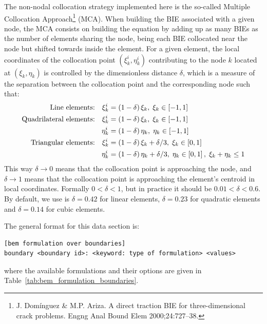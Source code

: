 \documentclass[a4paper,fleqn]{book}
\begin{document}
The non-nodal collocation strategy implemented here is the so-called Multiple Collocation Approach\footnote{J. Dom\'inguez \& M.P. Ariza. A direct traction BIE for three-dimensional
crack problems. Engng Anal Bound Elem 2000;24:727–38.} (MCA). When building the BIE associated with a given node, the MCA consists on building the equation by adding up as many BIEs as the number of elements sharing the node, being each BIE collocated near the node but shifted towards inside the element. For a given element, the local coordinates of the collocation point $(\xi^i_k,\eta^i_k)$ contributing to the node $k$ located at $(\xi_k,\eta_k)$ is controlled by the dimensionless distance $\delta$, which is a measure of the separation between the collocation point and the corresponding node such that:
\begin{align}
\textnormal{Line elements:}\quad\xi^i_k &= \left(1-\delta\right)\xi_k,\;\xi_k\in\left[-1,1\right] \\
\textnormal{Quadrilateral elements:}\quad\xi^i_k &= \left(1-\delta\right)\xi_k,\;\xi_k\in\left[-1,1\right] \\
\quad\eta^i_k &= \left(1-\delta\right)\eta_k,\;\eta_k\in\left[-1,1\right] \\
\textnormal{Triangular elements:}\quad\xi^i_k &= \left(1-\delta\right)\xi_k+\delta/3,\;\xi_k\in\left[0,1\right] \\
\quad\eta^i_k &= \left(1-\delta\right)\eta_k+\delta/3,\;\eta_k\in\left[0,1\right],\;\xi_k+\eta_k\leq1
\end{align}
This way $\delta\rightarrow0$ means that the collocation point is approaching the node, and $\delta\rightarrow1$ means that the collocation point is approaching the element's centroid in local coordinates. Formally $0<\delta<1$, but in practice it should be $0.01<\delta<0.6$. By default, we use is $\delta=0.42$ for linear elements, $\delta=0.23$ for quadratic elements and $\delta=0.14$ for cubic elements.


\noindent The general format for this data section is:
\begin{Verbatim}[frame=single, fontsize=\small, label={general format of section [bem formulation over boundaries]}]
[bem formulation over boundaries]
boundary <boundary id>: <keyword: type of formulation> <values>
\end{Verbatim} 
\noindent where the available formulations and their options are given in Table~\ref{tab:bem_formulation_boundaries}. 
\end{document}
